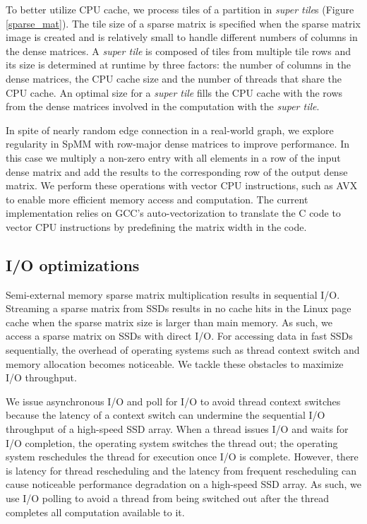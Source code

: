 To better utilize CPU cache, we process tiles of a partition in
\textit{super tile}s (Figure \ref{sparse_mat}). The tile size of a sparse
matrix is specified when the sparse matrix image is created and is relatively
small to handle different numbers of columns in the dense matrices.
A \textit{super tile} is composed of tiles from multiple tile rows and its
size is determined at runtime by three factors: the number of columns
in the dense matrices, the CPU cache size and the number of threads that
share the CPU cache. An optimal size for a \textit{super tile} fills
the CPU cache with the rows from the dense matrices involved in
the computation with the \textit{super tile}.

In spite of nearly random edge connection in a real-world graph, we explore
regularity in SpMM with row-major dense matrices to improve performance.
In this case we multiply a non-zero entry with all elements in a row of
the input dense matrix
and add the results to the corresponding row of the output dense matrix.
We perform these operations with vector CPU instructions, such as
AVX \cite{avx} to enable more efficient memory access and computation.
The current implementation relies on GCC's auto-vectorization
to translate the C code to vector CPU instructions by predefining the matrix
width in the code.

\subsection{I/O optimizations}
Semi-external memory sparse matrix multiplication results in sequential I/O.
Streaming a sparse matrix from SSDs results in no cache hits in the Linux
page cache when the sparse matrix size is larger than main memory. As such,
we access a sparse matrix on SSDs with direct I/O.
For accessing data in fast SSDs sequentially, the overhead of operating systems
such as thread context switch and memory allocation becomes noticeable.
We tackle these obstacles to maximize I/O throughput.

We issue asynchronous I/O and poll for I/O to avoid thread
context switches because the latency of a context switch can undermine
the sequential I/O throughput of a high-speed SSD array. When a thread issues
I/O and waits for I/O completion, the operating system switches the thread
out; the operating system reschedules the thread for execution once I/O is
complete. However, there is latency for thread rescheduling and the latency
from frequent rescheduling can cause noticeable performance degradation
on a high-speed SSD array. As such, we use I/O polling to avoid a thread from
being switched out after the thread completes all computation available to it.

